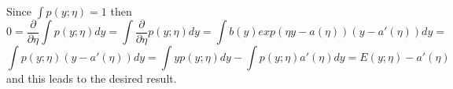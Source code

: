 \begin{answer}
Since $\int p(y;\eta) = 1$ then
$$0= \frac{\partial}{\partial \eta}\int p(y; \eta)dy = \int \frac{\partial}{\partial \eta} p(y; \eta)dy = \int b(y)exp(\eta y - a(\eta))(y - a'(\eta))dy =$$
$$\int p(y; \eta)(y - a'(\eta))dy = \int yp(y;\eta) dy -\int p(y;\eta)a'(\eta) dy = E(y; \eta) - a'(\eta)$$
and this leads to the desired result.
\end{answer}
